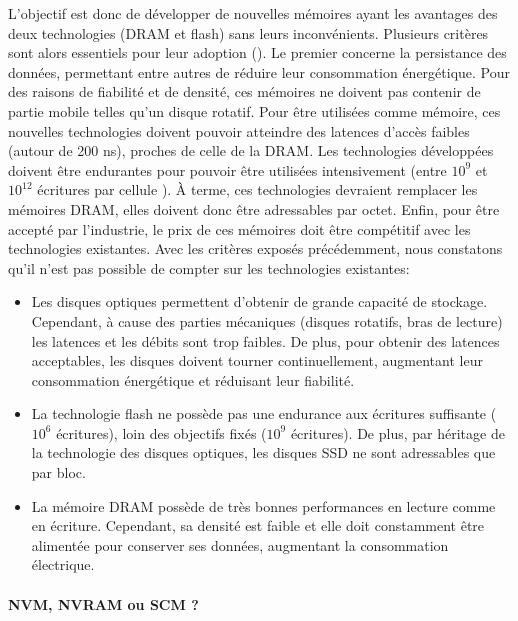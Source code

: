         L'objectif est donc de développer de nouvelles mémoires ayant les avantages des deux technologies (DRAM et flash) sans leurs inconvénients. Plusieurs critères sont alors essentiels pour leur adoption (\cite{Freitas2008}). Le premier  concerne la persistance des données, permettant entre autres de réduire leur consommation énergétique. Pour des raisons de fiabilité et de densité, ces mémoires ne doivent pas contenir de partie mobile telles qu'un disque rotatif. Pour être utilisées comme mémoire, ces nouvelles technologies doivent pouvoir atteindre des latences d'accès faibles (autour de 200 ns\cite{IBM2013}), proches de celle de la DRAM. Les technologies développées doivent être endurantes pour pouvoir être utilisées intensivement (entre $10^9$ et $10^{12}$ écritures par cellule \cite{IBM2013}). À terme, ces technologies devraient remplacer les mémoires DRAM, elles doivent donc être adressables par octet. Enfin, pour être accepté par l'industrie, le prix de ces mémoires doit être compétitif avec les technologies existantes. Avec les critères exposés précédemment, nous constatons qu'il n'est pas possible de compter sur les technologies existantes:
        \begin{itemize}
            \item Les disques optiques permettent d'obtenir de grande capacité de stockage. Cependant, à cause des parties mécaniques (disques rotatifs, bras de lecture) les latences et les débits sont trop faibles. De plus, pour obtenir des latences acceptables, les disques doivent tourner continuellement, augmentant leur consommation énergétique et réduisant leur fiabilité.
            \item La technologie flash ne possède pas une endurance aux écritures suffisante ($10^6$ écritures), loin des objectifs fixés ($10^9$ écritures). De plus, par héritage de la technologie des disques optiques, les disques SSD ne sont adressables que par bloc.
            \item La mémoire DRAM possède de très bonnes performances en lecture comme en écriture. Cependant, sa densité est faible et elle doit constamment être alimentée pour conserver ses données, augmentant la consommation électrique.
        \end{itemize}
  
        
    
        
        \paragraph{NVM, NVRAM ou SCM ?}
            
